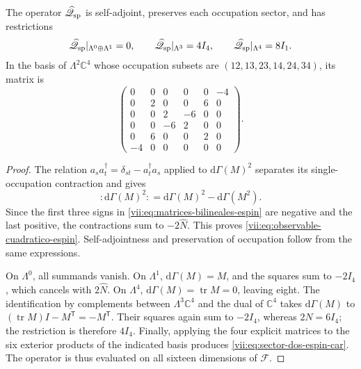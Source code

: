 \begin{proposition}
\label{vii:prop:operador-espin-car}
The operator \(\widehat{\mathscr Q}_{\rm sp}\) is self-adjoint,
preserves each occupation sector, and has restrictions
\begin{equation}
 \widehat{\mathscr Q}_{\rm sp}|_{\Lambda^0\oplus\Lambda^1}=0,
 \qquad
 \widehat{\mathscr Q}_{\rm sp}|_{\Lambda^3}=4I_4,
 \qquad
 \widehat{\mathscr Q}_{\rm sp}|_{\Lambda^4}=8I_1.
 \label{vii:eq:sectores-espin-car}
\end{equation}
In the basis of \(\Lambda^2\mathbb C^4\) whose occupation
subsets are \((12,13,23,14,24,34)\), its matrix is
\begin{equation}
 \begin{pmatrix}
 0&0&0&0&0&-4\\
 0&2&0&0&6&0\\
 0&0&2&-6&0&0\\
 0&0&-6&2&0&0\\
 0&6&0&0&2&0\\
 -4&0&0&0&0&0
 \end{pmatrix}.
 \label{vii:eq:sector-dos-espin-car}
\end{equation}
\end{proposition}
\begin{proof}
The relation \(a_s a_t^\dagger=\delta_{st}-a_t^\dagger a_s\)
applied to \(\mathrm d\Gamma(M)^2\) separates its single-occupation
contraction and gives
\[
 :\!\mathrm d\Gamma(M)^2\!:
 =\mathrm d\Gamma(M)^2-\mathrm d\Gamma(M^2).
\]
Since the first three signs in
\eqref{vii:eq:matrices-bilineales-espin} are negative and the last
positive, the contractions sum to \(-2\widehat N\).
This proves \eqref{vii:eq:observable-cuadratico-espin}.
Self-adjointness and preservation of occupation follow from
the same expressions.

On \(\Lambda^0\), all summands vanish. On \(\Lambda^1\),
\(\mathrm d\Gamma(M)=M\), and the squares sum to \(-2I_4\),
which cancels with \(2\widehat N\). On \(\Lambda^4\),
\(\mathrm d\Gamma(M)=\operatorname{tr}M=0\), leaving eight.
The identification by complements between \(\Lambda^3\mathbb C^4\)
and the dual of \(\mathbb C^4\) takes
\(\mathrm d\Gamma(M)\) to
\((\operatorname{tr}M)I-M^{\mathsf T}=-M^{\mathsf T}\).
Their squares again sum to \(-2I_4\), whereas
\(2\widehat N=6I_4\); the restriction is therefore \(4I_4\).
Finally, applying the four explicit matrices to the
six exterior products of the indicated basis produces
\eqref{vii:eq:sector-dos-espin-car}. The operator is thus evaluated
on all sixteen dimensions of \(\mathcal F\).
\end{proof}

